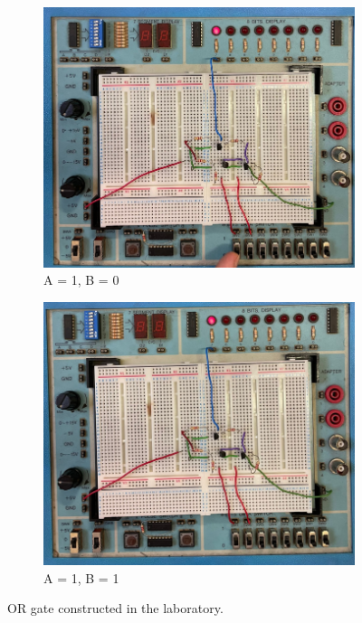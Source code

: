 \begin{figure}[H]
        \vspace{1cm} %

        \begin{subfigure}{0.45\textwidth}
            \centering
            \includegraphics[width=\linewidth]{figures/photos/OR/10.png}
            \caption{A = 1, B = 0}
        \end{subfigure}
        \hfill
        \begin{subfigure}{0.45\textwidth}
            \centering
            \includegraphics[width=\linewidth]{figures/photos/OR/11.png}
            \caption{A = 1, B = 1}
        \end{subfigure}

        \caption{OR gate constructed in the laboratory.}
        \label{fig:OR_photos}
    \end{figure}
